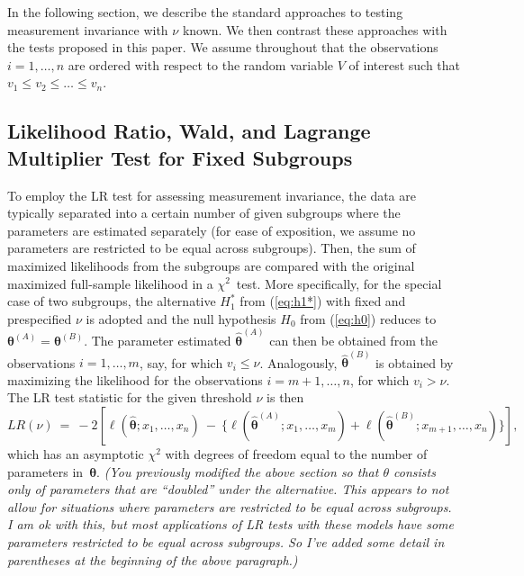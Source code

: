 \documentclass[man]{apa}
\newcommand{\readme}[1]{\emph{\marginpar{README} (#1)}}
\begin{document}
In the following section, we describe the standard approaches to
testing measurement invariance with $\nu$ known.  We then contrast
these approaches with the tests proposed in this paper.
We assume throughout that the observations $i = 1, \dots, n$ are
ordered with respect to the random variable $V$ of interest such that
$v_1 \le v_2 \le \dots \le v_n$.


\subsection{Likelihood Ratio, Wald, and Lagrange Multiplier Test for Fixed Subgroups}

To employ the LR test for assessing measurement invariance, the data
are typically separated into a certain number of given subgroups where
the parameters are estimated separately (for ease of
  exposition, we assume no parameters are restricted to be equal
  across subgroups). Then, the sum of maximized likelihoods 
from the subgroups are compared with the original maximized full-sample likelihood
in a $\chi^2$~test. More specifically, for the special case of two subgroups,
the alternative $H_1^*$ from (\ref{eq:h1*}) with fixed and prespecified $\nu$ is adopted
and the null hypothesis $H_0$ from (\ref{eq:h0}) reduces to ${\bm \theta}^{(A)} = {\bm \theta}^{(B)}$.
The parameter estimated $\hat {\bm \theta}^{(A)}$ can then be obtained from the
observations $i = 1, \dots, m$, say, for which $v_i \le \nu$. Analogously,
$\hat {\bm \theta}^{(B)}$ is obtained by maximizing the likelihood for the
observations $i = m + 1, \dots, n$, for which $v_i > \nu$. The LR test statistic
for the given threshold $\nu$ is then
\begin{equation} \label{eq:lr}
  \mathit{LR}(\nu) ~=~ -2 \left[
         \ell(\hat {\bm \theta}; x_1, \dots, x_n)
   ~-~ \{\ell(\hat {\bm \theta}^{(A)}; x_1, \dots, x_m)
    +    \ell(\hat {\bm \theta}^{(B)}; x_{m+1}, \dots, x_n)\}
    \right],
\end{equation}
which has an asymptotic $\chi^2$ with degrees of freedom equal to the number
of parameters in~${\bm \theta}$.
\readme{You previously modified the above section so that $\theta$
  consists only of parameters that are ``doubled'' under the
  alternative.  This appears to not allow for situations where
  parameters are restricted to be equal across subgroups.  I am ok
  with this, but most applications of LR tests with these models have
  some parameters restricted to be equal across subgroups.  So I've
  added some detail in parentheses at the beginning of the above
  paragraph.}
\end{document}

